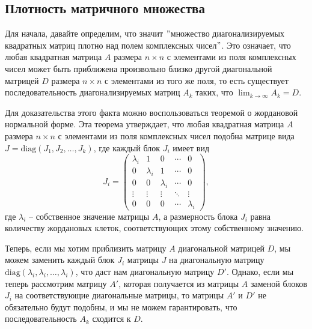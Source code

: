  \subsection*{Плотность матричного множества}

Для начала, давайте определим, что значит \("\)множество диагонализируемых квадратных матриц плотно над полем
комплексных чисел\("\).
Это означает, что любая квадратная матрица $A$ размера $n \times n$ с элементами из поля комплексных чисел может
быть приближена произвольно близко другой диагональной матрицей $D$ размера $n \times n$ с элементами из того же
поля, то есть существует последовательность диагонализируемых матриц $A_k$ таких, что $\lim_{k \to \infty} A_k = D$.

Для доказательства этого факта можно воспользоваться теоремой о жордановой нормальной форме.
Эта теорема утверждает, что любая квадратная матрица $A$ размера $n \times n$ с элементами из поля комплексных
чисел подобна матрице вида $J = \mathrm{diag}(J_1, J_2, \ldots, J_k)$, где каждый блок $J_i$ имеет вид
\[
    J_i = \begin{pmatrix}
              \lambda_i & 1         & 0         & \cdots & 0         \\
              0         & \lambda_i & 1         & \cdots & 0         \\
              0         & 0         & \lambda_i & \cdots & 0         \\
              \vdots    & \vdots    & \vdots    & \ddots & \vdots    \\
              0         & 0         & 0         & \cdots & \lambda_i
    \end{pmatrix},
\]
где $\lambda_i$ -- собственное значение матрицы $A$, а размерность блока $J_i$ равна количеству жордановых клеток,
соответствующих этому собственному значению.

Теперь, если мы хотим приблизить матрицу $A$ диагональной матрицей $D$, мы можем заменить каждый блок $J_i$
матрицы $J$ на диагональную матрицу $\mathrm{diag}(\lambda_i, \lambda_i, \ldots, \lambda_i)$, что даст нам диагональную матрицу $D'$.
Однако, если мы теперь рассмотрим матрицу $A'$, которая получается из матрицы $A$ заменой блоков $J_i$ на
соответствующие диагональные матрицы, то матрицы $A'$ и $D'$ не обязательно будут подобны, и мы не можем
гарантировать, что последовательность $A_k$ сходится к $D$.

